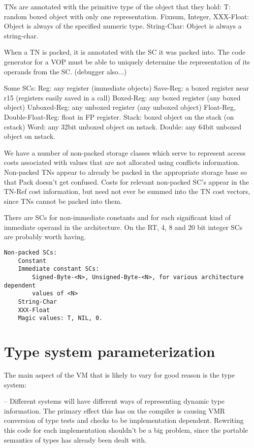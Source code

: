 TNs are annotated with the primitive type of the object that they hold:
    T: random boxed object with only one representation.
    Fixnum, Integer, XXX-Float: Object is always of the specified numeric type.
    String-Char: Object is always a string-char.

When a TN is packed, it is annotated with the SC it was packed into.  The code
generator for a VOP must be able to uniquely determine the representation of
its operands from the SC. (debugger also...)

Some SCs:
    Reg: any register (immediate objects)
    Save-Reg: a boxed register near r15 (registers easily saved in a call)
    Boxed-Reg: any boxed register (any boxed object)
    Unboxed-Reg: any unboxed register (any unboxed object)
    Float-Reg, Double-Float-Reg: float in FP register.
    Stack: boxed object on the stack (on cstack)
    Word: any 32bit unboxed object on nstack.
    Double: any 64bit unboxed object on nstack.

We have a number of non-packed storage classes which serve to represent access
costs associated with values that are not allocated using conflicts
information.  Non-packed TNs appear to already be packed in the appropriate
storage base so that Pack doesn't get confused.  Costs for relevant non-packed
SC's appear in the TN-Ref cost information, but need not ever be summed into
the TN cost vectors, since TNs cannot be packed into them.

There are SCs for non-immediate constants and for each significant kind of
immediate operand in the architecture.  On the RT, 4, 8 and 20 bit integer SCs
are probably worth having.

\begin{verbatim}
Non-packed SCs:
    Constant
    Immediate constant SCs:
        Signed-Byte-<N>, Unsigned-Byte-<N>, for various architecture dependent
	    values of <N>
	String-Char
	XXX-Float
	Magic values: T, NIL, 0.
\end{verbatim}

\chapter{Type system parameterization}

The main aspect of the VM that is likely to vary for good reason is the type
system:

 -- Different systems will have different ways of representing dynamic type
    information.  The primary effect this has on the compiler is causing VMR
    conversion of type tests and checks to be implementation dependent.
    Rewriting this code for each implementation shouldn't be a big problem,
    since the portable semantics of types has already been dealt with.

